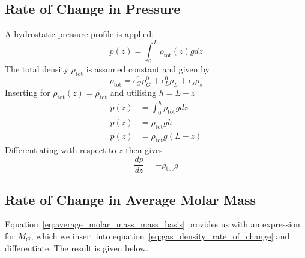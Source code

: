\documentclass{article}
\begin{document}
\subsection{Rate of Change in Pressure}
\label{sec:rate_of_change_pressure}
A hydrostatic pressure profile is applied;
\begin{equation}
	p(z) = \int_0^L\rho_{\mathrm{tot}}(z)gdz
\end{equation}
The total density $\rho_{\mathrm{tot}}$ is assumed constant and given by
\begin{equation}
	\rho_{\mathrm{tot}} = \epsilon_G^0\rho_G^0 + \epsilon_L^0\rho_L + \epsilon_s\rho_s
\end{equation}
Inserting for  $\rho_{\mathrm{tot}}(z)=\rho_{\mathrm{tot}}$ and utilising $h = L-z$
\begin{equation}
	\begin{split}
	p(z) &= \int_0^h\rho_{\mathrm{tot}}gdz\\
	p(z) &= \rho_{\mathrm{tot}}gh \\
	p(z) &= \rho_{\mathrm{tot}}g(L-z)
	\end{split}
\end{equation}
Differentiating with respect to $z$ then gives
\begin{equation}
	\frac{dp}{dz} = -\rho_{\mathrm{tot}}g
	\label{eq:rate_of_change_pressure}
\end{equation}

\subsection{Rate of Change in Average Molar Mass}
\label{sec:rate_of_change_average_molar_mass}
Equation~\ref{eq:average_molar_mass_mass_basis} provides us with an expression for $\overline{M_G}$, which we insert into equation~\ref{eq:gas_density_rate_of_change} and differentiate. The result is given below. 
\end{document}
